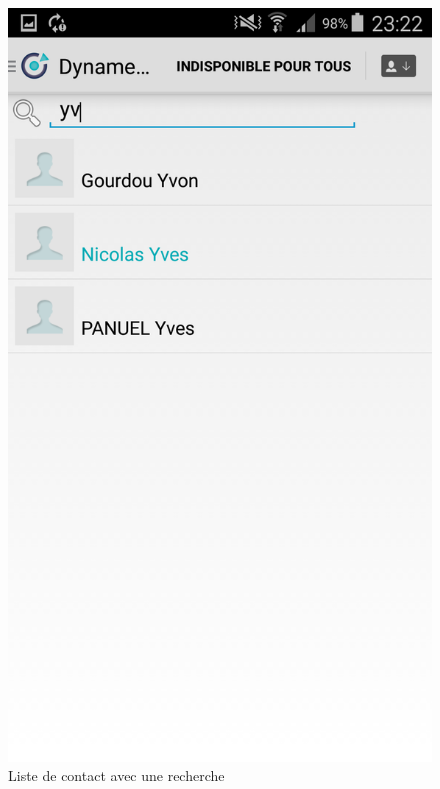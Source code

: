 \begin{frame}
\begin{columns}[t]
  \begin{column}{5cm} 
  	\begin{center}
	  \begin{figure}
	   \caption{Liste de contact avec une recherche}
        \includegraphics[scale=0.08]{images/recherche.png}
	  \end{figure}
	\end{center} 
  \end{column}
 \end{columns} 

\end{frame}

